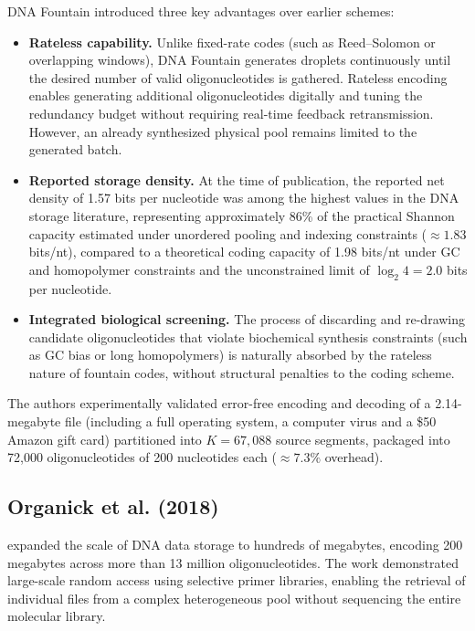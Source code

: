 DNA Fountain introduced three key advantages over earlier schemes:

\begin{itemize}
    \item \textbf{Rateless capability.} Unlike fixed-rate codes (such as Reed--Solomon or overlapping windows), DNA Fountain generates droplets continuously until the desired number of valid oligonucleotides is gathered. Rateless encoding enables generating additional oligonucleotides digitally and tuning the redundancy budget without requiring real-time feedback retransmission. However, an already synthesized physical pool remains limited to the generated batch.
    
    \item \textbf{Reported storage density.} At the time of publication, the reported net density of 1.57 bits per nucleotide was among the highest values in the DNA storage literature, representing approximately 86\% of the practical Shannon capacity estimated under unordered pooling and indexing constraints ($\approx 1.83$ bits/nt), compared to a theoretical coding capacity of 1.98 bits/nt under GC and homopolymer constraints and the unconstrained limit of $\log_2 4 = 2.0$ bits per nucleotide.
    
    \item \textbf{Integrated biological screening.} The process of discarding and re-drawing candidate oligonucleotides that violate biochemical synthesis constraints (such as GC bias or long homopolymers) is naturally absorbed by the rateless nature of fountain codes, without structural penalties to the coding scheme.
\end{itemize}

The authors experimentally validated error-free encoding and decoding of a 2.14-megabyte file (including a full operating system, a computer virus and a \$50 Amazon gift card) partitioned into $K = 67{,}088$ source segments, packaged into 72,000 oligonucleotides of 200 nucleotides each ($\approx 7.3\%$ overhead).

\subsection{Organick et al. (2018)}

 expanded the scale of DNA data storage to hundreds of megabytes, encoding 200 megabytes across more than 13 million oligonucleotides. The work demonstrated large-scale random access using selective primer libraries, enabling the retrieval of individual files from a complex heterogeneous pool without sequencing the entire molecular library.

